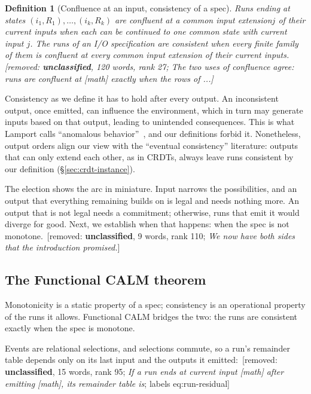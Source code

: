 \documentclass[sigconf]{cidr-2027}
\newtheorem{definition}{Definition}
\theoremstyle{remark}
\newcommand{\commitment}{commitment\xspace}
\newcommand{\indesc}{input extension\xspace} %
\newcommand{\outrelbase}{extend\xspace}       %
\newcommand{\spectype}[1][]{I/O specification#1\xspace}
\newcommand{\removednote}[1]{{\color{cutred}\footnotesize\,[removed: #1]\,}}
\begin{document}
\begin{definition}[Confluence at an input, consistency of a spec]
\label{def:consistency}
\textcolor{newblue}{Runs ending at states $(i_1,R_1),\ldots,(i_k,R_k)$ are \emph{confluent at} a
common \indesc $j$ of their current inputs when each can be continued to one
common state with current input $j$.} The runs of an \spectype are
\emph{consistent} when every finite family of them is confluent at every common
\indesc of their current inputs. \removednote{\textbf{unclassified}, 120 words, rank 27; \textit{The two uses of confluence agree: runs are confluent at [math] exactly when the rows of ...}}
\end{definition}

\textcolor{newblue}{Consistency as we define it has to hold after every output.} \textcolor{newblue}{An inconsistent
output, once emitted, can influence the environment, which in turn may generate
inputs based on that output, leading to unintended consequences.} \textcolor{newblue}{This is what
Lamport calls ``anomalous behavior''~\cite{lamport1978time}, and our
definitions forbid it.} \textcolor{newblue}{Nonetheless, output orders align our view with the ``eventual
consistency'' literature: outputs that can only \outrelbase each other, as in
CRDTs, always leave runs consistent by our definition (\S\ref{sec:crdt-instance}).}

The election shows the arc in miniature. Input narrows the
possibilities, and an output that everything remaining builds on is legal and
needs nothing more. An output that is not legal needs a \commitment; otherwise,
runs that emit it would diverge for good. Next, we establish when that
happens: when the spec is not monotone. \removednote{\textbf{unclassified}, 9 words, rank 110; \textit{We now have both sides that the introduction promised.}}

\subsection{The Functional CALM theorem}
\label{sec:functional-calm-theorem}

\textcolor{newblue}{Monotonicity is a
static property of a spec; consistency is an operational property
of the runs it allows.} Functional CALM bridges the two: the runs are consistent exactly when
the spec is monotone.

Events are
relational selections, and selections commute, so a run's remainder table
depends only on its last input and the outputs it emitted: \removednote{\textbf{unclassified}, 15 words, rank 95; \textit{If a run ends at current input [math] after emitting [math], its remainder table is}; labels eq:run-residual}
\end{document}
